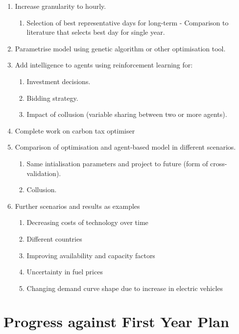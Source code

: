 \documentclass[12pt]{article}
\begin{document}
\begin{enumerate}
  \item Increase granularity to hourly.
  \begin{enumerate}
  \item Selection of best representative days for long-term - Comparison to literature that selects best day for single year.
  \end{enumerate}
  \item  Parametrise model using genetic algorithm or other optimisation tool.

  \item Add intelligence to agents using reinforcement learning for:
  \begin{enumerate}
      \item Investment decisions.
      \item Bidding strategy.
      \item Impact of collusion (variable sharing between two or more agents).
  \end{enumerate}
  \item Complete work on carbon tax optimiser
  \item Comparison of optimisation and agent-based model in different scenarios.
  \begin{enumerate}
  \item Same intialisation parameters and project to future (form of cross-validation).
  \item Collusion.
  \end{enumerate}
  \item Further scenarios and results as examples
  \begin{enumerate}
  \item Decreasing costs of technology over time
  \item Different countries
  \item Improving availability and capacity factors
  \item Uncertainty in fuel prices
  \item Changing demand curve shape due to increase in electric vehicles
\end{enumerate}

\end{enumerate}




\clearpage

\section{Progress against First Year Plan}
\end{document}
